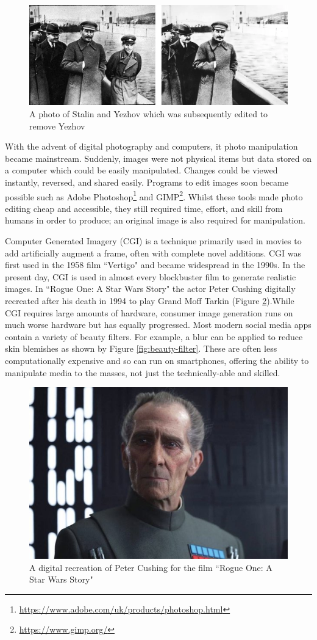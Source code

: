 \begin{figure}[H]
    \centering
    \includegraphics[width=0.5\linewidth]{dissertation//figures/stalin.png}
    \caption{A photo of Stalin and Yezhov which was subsequently edited to remove Yezhov}
    \label{fig:stalin-yezhov}
\end{figure}

With the advent of digital photography and computers, it photo manipulation became mainstream. Suddenly, images were not physical items but data stored on a computer which could be easily manipulated. Changes could be viewed instantly, reversed, and shared easily. Programs to edit images soon became possible such as Adobe Photoshop\footnote{\url{https://www.adobe.com/uk/products/photoshop.html}} and GIMP\footnote{\url{https://www.gimp.org/}}. Whilst these tools made photo editing cheap and accessible, they still required time, effort, and skill from humans in order to produce; an original image is also required for manipulation.

Computer Generated Imagery (CGI) is a technique primarily used in movies to add artificially augment a frame, often with complete novel additions. CGI was first used in the 1958 film ``Vertigo" and became widespread in the 1990s\cite{ozturk2023vicious}. In the present day, CGI is used in almost every blockbuster film to generate realistic images. In ``Rogue One: A Star Wars Story" the actor Peter Cushing digitally recreated after his death in 1994 to play Grand Moff Tarkin (Figure \ref{fig:tarkin}).While CGI requires large amounts of hardware, consumer image generation runs on much worse hardware but has equally progressed. Most modern social media apps contain a variety of beauty filters\cite{corcoran2014digital}. For example, a blur can be applied to reduce skin blemishes as shown by Figure \ref{fig:beauty-filter}. These are often less computationally expensive and so can run on smartphones, offering the ability to manipulate media to the masses, not just the technically-able and skilled.

\begin{figure}[H]
    \centering
    \includegraphics[width=0.5\linewidth]{dissertation//figures/grandmoff-tarkin.jpg}
    \caption{A digital recreation of Peter Cushing for the film ``Rogue One: A Star Wars Story"\cite{rogueone}}
    \label{fig:tarkin}
\end{figure}

